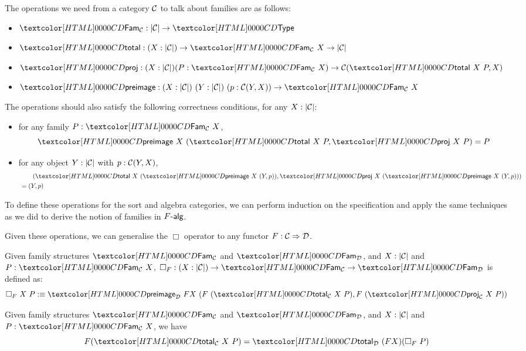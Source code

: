 \begin{definition}
  The operations we need from a category $\mathcal{C}$ to talk about families
  are as follows:
%
  \begin{itemize}
  \item $\Fam_{\Cc} : | \Cc | \to \Type$
  \item $\total : (X : | \Cc |) \to \Fam_{\Cc}\ X \to | \Cc |$
  \item
    $\proj : (X : | \Cc |) (P : \Fam_{\Cc}\ X) \to \Cc(\total\ X\ P,
    X)$
  \item
    $\preimage : (X : | \Cc |)\ (Y : | \Cc |)\ (p : \Cc(Y,X)) \to
    \Fam_{\Cc}\ X$
  \end{itemize}
%
  The operations should also satisfy the following correctness
  conditions, for any $X : | \mathcal{C} |$:
%
  \begin{itemize}
  \item for any family $P : \Fam_{\Cc}\ X$,
  $$\preimage\ X\ (\total\ X\ P , \proj\ X\ P) = P$$
\item for any object $Y : | \mathcal{C} |$ with $p : \mathcal{C}(Y,X)$,
  \begin{align*}
    &\ \ \ \ \ \ (\total\ X\ (\preimage\ X\ (Y,p)) , \proj\ X\ (\preimage\ X\ (Y,p))) \\
    &= (Y,p)
  \end{align*}
\end{itemize}
%
\end{definition}
To define these operations for the sort and algebra categories, we can
perform induction on the specification and apply the same techniques
as we did to derive the notion of families in $\algcat{F}$.

Given these operations, we can generalise the $\Box$ operator to any
functor $F : \mathcal{C} \Rightarrow \mathcal{D}$.

\begin{definition}
  Given family structures $\Fam_{\Cc}$ and $\Fam_{\Dd}$, and
  $X : | \mathcal{C} |$ and $P : \Fam_{\Cc}\ X$,
  $\Box_F : (X : | \Cc |) \to \Fam_{\Cc} \to \Fam_{\Dd}$ is defined
  as:
  $$
  \Box_F\ X\ P \ddefeq \preimage_{\Dd}\ FX\ (F\ (\total_{\Cc}\ X\ P) ,
  F\ (\proj_{\Cc}\ X\ P))
  $$
\end{definition}

\begin{proposition}
  \label{box-thm}
  Given family structures $\Fam_{\Cc}$ and $\Fam_{\Dd}$, and
  $X : | \mathcal{C} |$ and $P : \Fam_{\Cc}\ X$, we have
  $$
  F (\total_{\Cc}\ X\ P) = \total_{\Dd}\ (F X) (\Box_F\ P)
  $$
\end{proposition}


